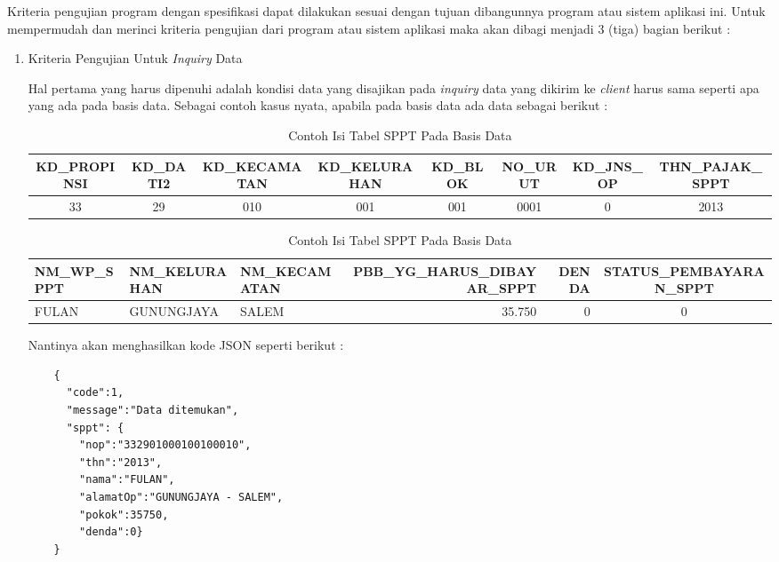 \documentclass[pdftex,12pt, oneside]{article}
\begin{document}
Kriteria pengujian program dengan spesifikasi dapat dilakukan sesuai dengan tujuan dibangunnya program atau sistem aplikasi ini. Untuk mempermudah dan merinci kriteria pengujian dari program atau sistem aplikasi maka akan dibagi menjadi 3 (tiga) bagian berikut :

\begin{enumerate}[1.]
  \item Kriteria Pengujian Untuk \textit{Inquiry} Data
  
  Hal pertama yang harus dipenuhi adalah kondisi data yang disajikan pada \textit{inquiry} data yang dikirim ke \textit{client} harus sama seperti apa yang ada pada basis data. Sebagai contoh kasus nyata, apabila pada basis data ada data sebagai berikut :
  \begin{table}[H]
    \resizebox{8cm}{!}
      {
        \begin{minipage}{1\textwidth}
        \begin{tabular}{|c|c|c|c|c|c|c|c|}
          \hline
          \textbf{KD\_PROPINSI} & \textbf{KD\_DATI2} & \textbf{KD\_KECAMATAN} & \textbf{KD\_KELURAHAN} & \textbf{KD\_BLOK} & \textbf{NO\_URUT} & \textbf{KD\_JNS\_OP} & \textbf{THN\_PAJAK\_SPPT} \\
          \hline \hline
          33 & 29 & 010 & 001 & 001 & 0001 & 0 & 2013 \\
          \hline
        \end{tabular}
  
        \begin{tabular}{|l|l|l|r|r|c|}
          \hline
      	  \textbf{NM\_WP\_SPPT} & \textbf{NM\_KELURAHAN} & \textbf{NM\_KECAMATAN} & \textbf{PBB\_YG\_HARUS\_DIBAYAR\_SPPT} & \textbf{DENDA} & \textbf{STATUS\_PEMBAYARAN\_SPPT} \\
   	      \hline \hline
       	  FULAN & GUNUNGJAYA & SALEM & 35.750 & 0 & 0 \\
       	  \hline
        \end{tabular}
        \centering
      \end{minipage}
    }
    \caption{Contoh Isi Tabel SPPT Pada Basis Data}
  \end{table}
  
  Nantinya akan menghasilkan kode JSON seperti berikut :
  
  \begin{lstlisting}
    {
      "code":1,
      "message":"Data ditemukan",
      "sppt": {
        "nop":"332901000100100010",
        "thn":"2013",
        "nama":"FULAN",
        "alamatOp":"GUNUNGJAYA - SALEM",
        "pokok":35750,
        "denda":0}
    }
  \end{lstlisting}
  

\end{enumerate}
\end{document}
